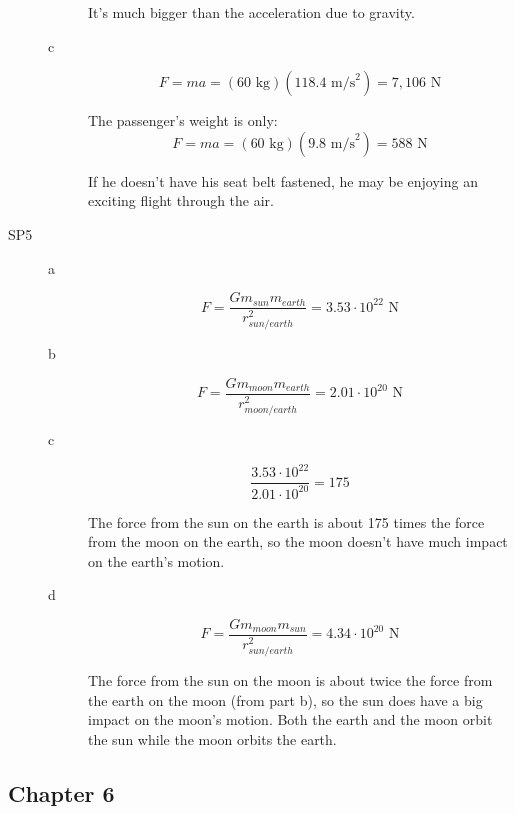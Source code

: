 \documentclass{exam}
\begin{document}
\begin{description}
\begin{description}
It's much bigger than the acceleration due to gravity.

\item[c]
\[
  F = ma = (60 \text{ kg})(118.4 \text{ m/s}^2) = 7,106 \text{ N}
\]

The passenger's weight is only:
\[
  F = ma = (60 \text{ kg})(9.8 \text{ m/s}^2) = 588 \text{ N}
\]

If he doesn't have his seat belt fastened, he may be enjoying an exciting flight through the air.

\end{description}

\item[SP5]
\begin{description}

\item[a]
\[
  F = \frac{Gm_{sun}m_{earth}}{r_{sun/earth}^2} = 3.53 \cdot 10^{22} \text{ N}
\]

\item[b]
\[
  F = \frac{Gm_{moon}m_{earth}}{r_{moon/earth}^2} = 2.01 \cdot 10^{20} \text{ N}
\]

\item[c]
\[
  \frac{3.53 \cdot 10^{22}}{2.01 \cdot 10^{20}} = 175
\]

The force from the sun on the earth is about 175 times the force from the moon on the earth, so the moon doesn't have
much impact on the earth's motion.

\item[d]
\[
  F = \frac{Gm_{moon}m_{sun}}{r_{sun/earth}^2} = 4.34 \cdot 10^{20} \text{ N}
\]

The force from the sun on the moon is about twice the force from the earth on the moon (from part b), so the sun does
have a big impact on the moon's motion.  Both the earth and the moon orbit the sun while the moon orbits the earth.

\end{description}
\end{description}

\subsection{Chapter 6}
\end{document}
